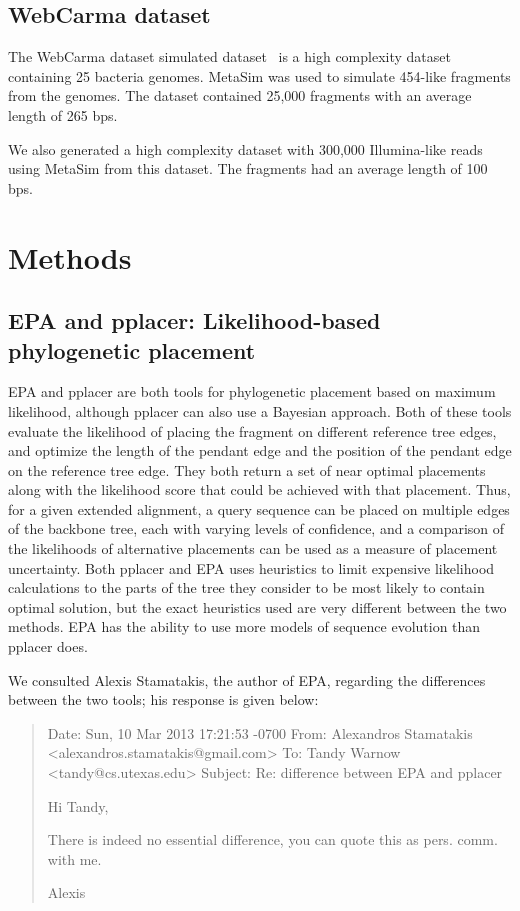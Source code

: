 \subsection{WebCarma dataset}  
The WebCarma dataset simulated dataset~\cite{Gerlach2011b} is a high complexity dataset containing 25 bacteria genomes.  MetaSim was used to simulate 454-like fragments from the genomes.  The dataset contained 25,000 fragments with an average length of 265 bps.   

We also generated a high complexity dataset with 300,000 Illumina-like reads using MetaSim from this dataset.  The fragments had an average length of 100 bps.

\section{Methods\label{tipp:methods}}

\subsection {EPA and pplacer: Likelihood-based phylogenetic placement}
EPA and pplacer are both tools for phylogenetic placement based on maximum likelihood, 
although pplacer can also use a Bayesian approach. 
Both of these tools evaluate the likelihood of placing
the fragment on different reference tree edges, and optimize 
the length of the pendant edge and the position of the pendant edge on the reference
tree edge. They both return a set of 
near optimal placements along with the likelihood
score that could be achieved with that placement.
Thus, for a given extended alignment, 
a query sequence can be placed on multiple edges of the backbone tree,
each with varying levels of confidence, 
and a comparison of the  likelihoods of alternative placements can 
be used
as a measure of placement uncertainty.
Both pplacer and EPA uses heuristics to limit expensive likelihood calculations to 
the parts of the tree they consider to be most likely to contain optimal solution,
but the exact heuristics used are very different between the two methods.
EPA has the ability to use more models of sequence evolution than pplacer does. 

We consulted Alexis Stamatakis, the author of 
EPA, regarding the differences between the two tools; his response
is given below:

\begin{quote}
Date: Sun, 10 Mar 2013 17:21:53 -0700
From: Alexandros Stamatakis <alexandros.stamatakis@gmail.com>
To: Tandy Warnow <tandy@cs.utexas.edu>
Subject: Re: difference between EPA and pplacer

Hi Tandy,

There is indeed no essential difference, you can quote this as pers.
comm. with me.

Alexis
\end{quote}

